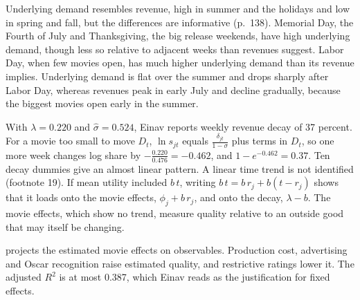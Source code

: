 Underlying demand resembles revenue, high in summer and the holidays and low in spring and fall, but the
differences are informative (p.~138). Memorial Day, the Fourth of July and Thanksgiving, the big release weekends,
have high underlying demand, though less so relative to adjacent weeks than revenues suggest. Labor Day, when few
movies open, has much higher underlying demand than its revenue implies. Underlying demand is flat over the summer
and drops sharply after Labor Day, whereas revenues peak in early July and decline gradually, because the biggest
movies open early in the summer.

With $\lambda = 0.220$ and $\hat\sigma = 0.524$, Einav reports weekly revenue decay of 37 percent. For a movie too
small to move $D_t$, $\ln s_{jt}$ equals $\frac{\delta_{jt}}{1-\sigma}$ plus terms in $D_t$, so one more week
changes log share by $-\frac{0.220}{0.476} = -0.462$, and $1 - e^{-0.462} = 0.37$. Ten decay dummies give an almost
linear pattern. A linear time trend is not identified (footnote 19). If mean utility included $b\,t$, writing
$b\,t = b\,r_j + b(t - r_j)$ shows that it loads onto the movie effects, $\phi_j + b\,r_j$, and
onto the decay, $\lambda - b$. The movie effects, which show no trend, measure quality relative to an outside
good that may itself be changing.

 projects the estimated movie effects on observables. Production cost, advertising and
Oscar recognition raise estimated quality, and restrictive ratings lower it. The adjusted $R^2$ is at most 0.387,
which Einav reads as the justification for fixed effects.


